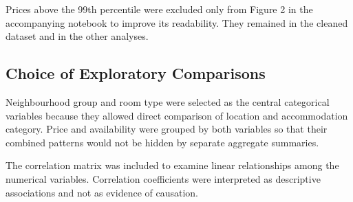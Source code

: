 Prices above the 99th percentile were excluded only from Figure 2 in the accompanying notebook
to improve its readability. They remained in the cleaned dataset and in the
other analyses.

\subsection{Choice of Exploratory Comparisons}

Neighbourhood group and room type were selected as the central categorical
variables because they allowed direct comparison of location and accommodation
category. Price and availability were grouped by both variables so that their
combined patterns would not be hidden by separate aggregate summaries.

The correlation matrix was included to examine linear relationships among the
numerical variables. Correlation coefficients were interpreted as descriptive
associations and not as evidence of causation.